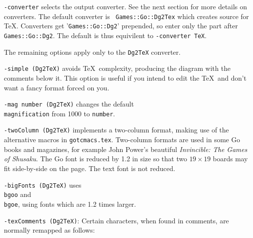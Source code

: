 {\tt -converter} selects the output converter.  See the next section
for more details on converters.  The default converter is {\tt
Games::Go::Dg2Tex} which creates source for \TeX.  Converters get
'{\tt Games::Go::Dg2}' prepended, so enter only the part after {\tt Games::Go::Dg2}.
The default is thus equivilent to {\tt -converter TeX}.

The remaining options apply only to the {\tt Dg2TeX} converter.

{\tt -simple (Dg2TeX)} avoids \TeX\ complexity, producing the diagram with
the comments below it. This option is useful if you intend to edit
the \TeX\ and don't want a fancy format forced on you.

{\tt -mag number (Dg2TeX)} changes the default {\tt \\magnification} from
1000 to {\tt number}.

{\tt -twoColumn (Dg2TeX)} implements a two-column format, making use of the alternative
macros in {\tt gotcmacs.tex}. Two-column formats are used in some Go books and
magazines, for example John Power's beautiful {\it Invincible: The Games of
Shusaku}. The Go font is reduced by 1.2 in size so that two $19\times 19$
boards may fit side-by-side on the page. The text font is not reduced.

{\tt -bigFonts (Dg2TeX)} uses {\tt \\bgoo} and {\tt \\bgoe}, using fonts which
are 1.2 times larger.

\vfil\eject  %
{\tt -texComments (Dg2TeX)}: Certain characters, when found in comments, are normally
remapped as follows:

\medbreak
\centerline{
\vbox{
\baselineskip=15pt
}}
\medbreak

